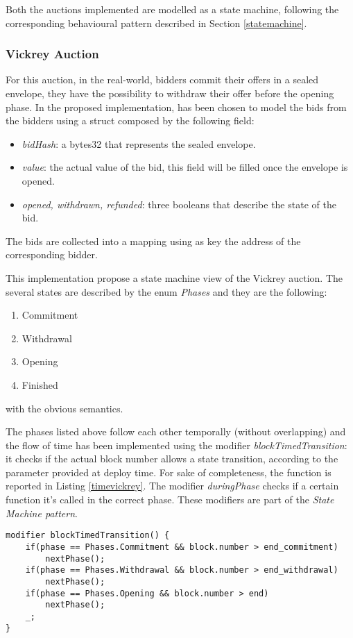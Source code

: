 \documentclass{article}
\begin{document}
Both the auctions implemented are modelled as a state machine, following the corresponding behavioural pattern described in Section \ref{statemachine}.
\subsubsection{Vickrey Auction}\label{vickrey}
For this auction, in the real-world, bidders commit their offers in a sealed envelope, they have the possibility to withdraw their offer before the opening phase.
In the proposed implementation, has been chosen to model the bids from the bidders using a struct composed by the following field:
\begin{itemize}
    \item \textit{bidHash}: a bytes32 that represents the sealed envelope.
    \item \textit{value}: the actual value of the bid, this field will be filled once the envelope is opened.
    \item \textit{opened, withdrawn, refunded}: three booleans that describe the state of the bid.
\end{itemize}
The bids are collected into a mapping using as key the address of the corresponding bidder.

This implementation propose a state machine view of the Vickrey auction. The several states are described by the enum \textit{Phases} and they are the following:
\begin{enumerate}
    \item Commitment
    \item Withdrawal
    \item Opening
    \item Finished
\end{enumerate}
with the obvious semantics. 

The phases listed above follow each other temporally (without overlapping) and the flow of time has been implemented using the modifier \textit{blockTimedTransition}: it checks if the actual block number allows a state transition, according to the parameter provided at deploy time. For sake of completeness, the function is reported in Listing \ref{timevickrey}. The modifier \textit{duringPhase} checks if a certain function it's called in the correct phase. These modifiers are part of the \textit{State Machine pattern}.

\begin{lstlisting}[language=Solidity, caption={Modifier used for modelling the time flow during a Vickrey auction. The function \textit{nextPhase()} realise the transition from the actual phase to the next one, following the order described above and emitting an event.},captionpos=b, label=timevickrey]
modifier blockTimedTransition() {
    if(phase == Phases.Commitment && block.number > end_commitment)
        nextPhase();
    if(phase == Phases.Withdrawal && block.number > end_withdrawal)
        nextPhase();
    if(phase == Phases.Opening && block.number > end)
        nextPhase();
    _;
}
\end{lstlisting}
\end{document}
